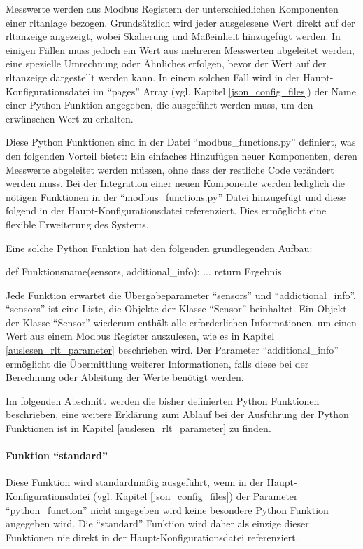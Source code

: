 \label{python_functions}
Messwerte werden aus Modbus Registern der unterschiedlichen Komponenten einer \acs{rltanlage} bezogen.  Grundsätzlich wird jeder ausgelesene Wert direkt auf der \acs{rltanzeige} angezeigt, wobei Skalierung und Maßeinheit hinzugefügt werden. In einigen Fällen muss jedoch ein Wert aus mehreren Messwerten abgeleitet werden, eine spezielle Umrechnung oder Ähnliches erfolgen, bevor der Wert auf der \acs{rltanzeige} dargestellt werden kann. In einem solchen Fall wird in der Haupt-Konfigurationsdatei im \enquote{pages} Array (vgl. Kapitel \ref{json_config_files}) der Name einer Python Funktion angegeben, die ausgeführt werden muss, um den erwünschen Wert zu erhalten. 

Diese Python Funktionen sind in der Datei \enquote{modbus\_functions.py} definiert, was den folgenden Vorteil bietet: Ein einfaches Hinzufügen neuer Komponenten, deren Messwerte abgeleitet werden müssen, ohne dass der restliche Code verändert werden muss. Bei der Integration einer neuen Komponente werden lediglich die nötigen Funktionen in der \enquote{modbus\_functions.py} Datei hinzugefügt und diese folgend in der Haupt-Konfigurationsdatei referenziert. Dies ermöglicht eine flexible  Erweiterung des Systems.

Eine solche Python Funktion hat den folgenden grundlegenden Aufbau:
\begin{pythoncode}
def Funktionsname(sensors, additional_info):
	...	
	return Ergebnis
\end{pythoncode}

Jede Funktion erwartet die Übergabeparameter \enquote{sensors} und \enquote{addictional\_info}. \enquote{sensors} ist eine Liste, die Objekte der Klasse \enquote{Sensor} beinhaltet. Ein Objekt der Klasse \enquote{Sensor} wiederum enthält alle erforderlichen Informationen, um einen Wert aus einem Modbus Register auszulesen, wie es in Kapitel \ref{auslesen_rlt_parameter} beschrieben wird. \newline 
Der Parameter \enquote{additional\_info} ermöglicht die Übermittlung weiterer Informationen, falls diese bei der Berechnung oder Ableitung der Werte benötigt werden.

Im folgenden Abschnitt werden die bisher definierten Python Funktionen beschrieben, eine weitere Erklärung zum Ablauf bei der Ausführung der Python Funktionen ist in Kapitel \ref{auslesen_rlt_parameter} zu finden.


\paragraph{Funktion \enquote{standard}}
Diese Funktion wird standardmäßig ausgeführt, wenn in der Haupt-Konfigurationsdatei (vgl. Kapitel \ref{json_config_files}) der Parameter \enquote{python\_function} nicht angegeben wird \bzw keine besondere Python Funktion angegeben wird. Die \enquote{standard} Funktion wird daher als einzige dieser Funktionen nie direkt in der Haupt-Konfigurationsdatei referenziert.

